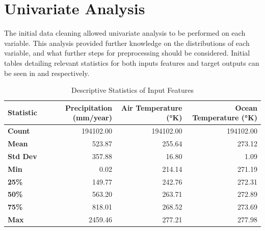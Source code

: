 \section{Univariate Analysis}\label{S:UVA}

The initial data cleaning allowed univariate analysis to be performed on each variable. This analysis provided further knowledge on the distributions of each variable, and what further steps for preprocessing should be considered. Initial tables detailing relevant statistics for both inputs features and target outputs can be seen in  and  respectively.
\begin{table}[H]
\centering
\caption{Descriptive Statistics of Input Features}
\label{tab:input_features_describe}
\scriptsize
\begin{tabular}{lrrr}
\toprule
\textbf{Statistic} & \textbf{Precipitation (mm/year)} & \textbf{Air Temperature (°K)} & \textbf{Ocean Temperature (°K)} \\ \midrule
\textbf{Count}     & 194102.00    & 194102.00     & 194102.00     \\
\textbf{Mean}      & 523.87       & 255.64        & 273.12        \\
\textbf{Std Dev}   & 357.88       & 16.80         & 1.09          \\
\textbf{Min}       & 0.02         & 214.14        & 271.19        \\
\textbf{25\%}      & 149.77       & 242.76        & 272.31        \\
\textbf{50\%}      & 563.20       & 263.71        & 272.89        \\
\textbf{75\%}      & 818.01       & 268.52        & 273.69        \\
\textbf{Max}       & 2459.46      & 277.21        & 277.98        \\ \bottomrule
\end{tabular}
\end{table}

